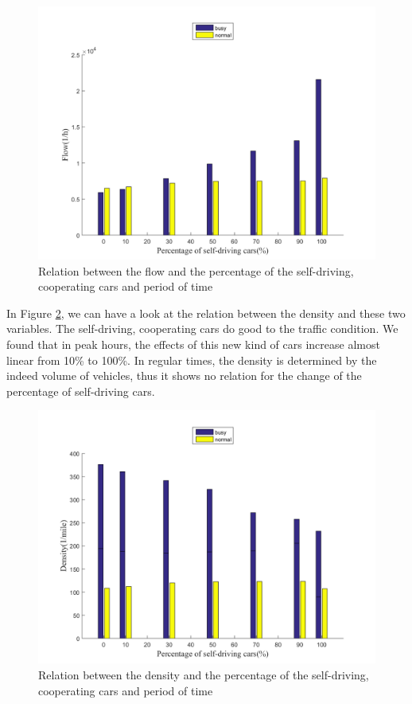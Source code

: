 \documentclass[a4paper]{article}
\begin{document}
	\begin{figure}[H]
		\centering
		\includegraphics[scale=0.5]{../imgs/all_bar_2}
		\caption{Relation between the flow and the percentage of the self-driving, cooperating cars and period of time}
		\label{all_bar_2}
	\end{figure}

	In Figure \ref{all_bar_3}, we can have a look at the relation between the density and these two variables. The self-driving, cooperating cars do good to the traffic condition. We found that in peak hours, the effects of this new kind of cars increase almost linear from 10\% to 100\%. In regular times, the density is determined by the indeed volume of vehicles, thus it shows no relation for the change of the percentage of self-driving cars.

	\begin{figure}[H]
		\centering
		\includegraphics[scale=0.5]{../imgs/all_bar_3}
		\caption{Relation between the density and the percentage of the self-driving, cooperating cars and period of time}
		\label{all_bar_3}
	\end{figure}
\end{document}
